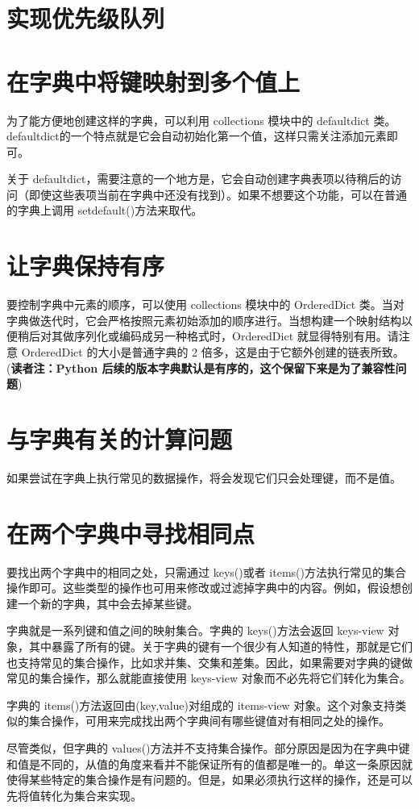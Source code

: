 \section{实现优先级队列}
\section{在字典中将键映射到多个值上\label{sec1.6}}
为了能方便地创建这样的字典，可以利用 collections 模块中的 defaultdict 类。defaultdict的一个特点就是它会自动初始化第一个值，这样只需关注添加元素即可。

关于 defaultdict，需要注意的一个地方是，它会自动创建字典表项以待稍后的访问（即使这些表项当前在字典中还没有找到）。如果不想要这个功能，可以在普通的字典上调用 setdefault()方法来取代。
\section{让字典保持有序}
要控制字典中元素的顺序，可以使用 collections 模块中的 OrderedDict 类。当对字典做迭代时，它会严格按照元素初始添加的顺序进行。当想构建一个映射结构以便稍后对其做序列化或编码成另一种格式时，OrderedDict 就显得特别有用。请注意 OrderedDict 的大小是普通字典的 2 倍多，这是由于它额外创建的链表所致。(\textbf{读者注：Python 后续的版本字典默认是有序的，这个保留下来是为了兼容性问题})
\section{与字典有关的计算问题}
如果尝试在字典上执行常见的数据操作，将会发现它们只会处理键，而不是值。
\section{在两个字典中寻找相同点}
要找出两个字典中的相同之处，只需通过 keys()或者 items()方法执行常见的集合操作即可。这些类型的操作也可用来修改或过滤掉字典中的内容。例如，假设想创建一个新的字典，其中会去掉某些键。

字典就是一系列键和值之间的映射集合。字典的 keys()方法会返回 keys-view 对象，其中暴露了所有的键。关于字典的键有一个很少有人知道的特性，那就是它们也支持常见的集合操作，比如求并集、交集和差集。因此，如果需要对字典的键做常见的集合操作，那么就能直接使用 keys-view 对象而不必先将它们转化为集合。

字典的 items()方法返回由(key,value)对组成的 items-view 对象。这个对象支持类似的集合操作，可用来完成找出两个字典间有哪些键值对有相同之处的操作。

尽管类似，但字典的 values()方法并不支持集合操作。部分原因是因为在字典中键和值是不同的，从值的角度来看并不能保证所有的值都是唯一的。单这一条原因就使得某些特定的集合操作是有问题的。但是，如果必须执行这样的操作，还是可以先将值转化为集合来实现。
